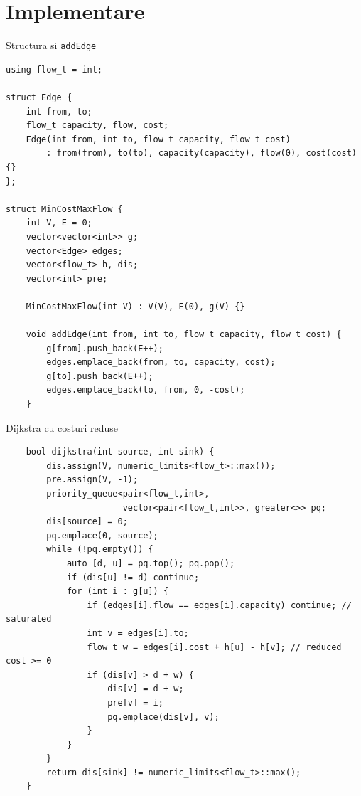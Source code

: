 ﻿\documentclass[9pt]{beamer}
\begin{document}
\section{Implementare}

\begin{frame}[fragile]{Structura si \texttt{addEdge}}
  \begin{lstlisting}[belowskip=0pt]
using flow_t = int;

struct Edge {
    int from, to;
    flow_t capacity, flow, cost;
    Edge(int from, int to, flow_t capacity, flow_t cost)
        : from(from), to(to), capacity(capacity), flow(0), cost(cost) {}
};

struct MinCostMaxFlow {
    int V, E = 0;
    vector<vector<int>> g;
    vector<Edge> edges;
    vector<flow_t> h, dis;
    vector<int> pre;

    MinCostMaxFlow(int V) : V(V), E(0), g(V) {}

    void addEdge(int from, int to, flow_t capacity, flow_t cost) {
        g[from].push_back(E++);
        edges.emplace_back(from, to, capacity, cost);
        g[to].push_back(E++);
        edges.emplace_back(to, from, 0, -cost);
    }
  \end{lstlisting}
\end{frame}

\begin{frame}{Dijkstra cu costuri reduse}
  \begin{lstlisting}
    bool dijkstra(int source, int sink) {
        dis.assign(V, numeric_limits<flow_t>::max());
        pre.assign(V, -1);
        priority_queue<pair<flow_t,int>,
                       vector<pair<flow_t,int>>, greater<>> pq;
        dis[source] = 0;
        pq.emplace(0, source);
        while (!pq.empty()) {
            auto [d, u] = pq.top(); pq.pop();
            if (dis[u] != d) continue;
            for (int i : g[u]) {
                if (edges[i].flow == edges[i].capacity) continue; // saturated
                int v = edges[i].to;
                flow_t w = edges[i].cost + h[u] - h[v]; // reduced cost >= 0
                if (dis[v] > d + w) {
                    dis[v] = d + w;
                    pre[v] = i;
                    pq.emplace(dis[v], v);
                }
            }
        }
        return dis[sink] != numeric_limits<flow_t>::max();
    }
  \end{lstlisting}
\end{frame}
\end{document}
